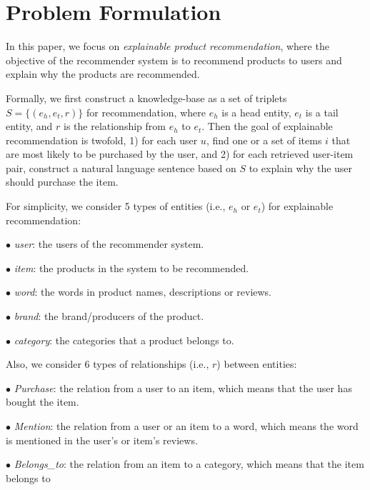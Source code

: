\documentclass[algorithms,article,accept,moreauthors,pdftex,10pt,a4paper]{Definitions/mdpi}
\begin{document}
\section{Problem Formulation}\label{sec:formalization}

In this paper, we focus on \textit{explainable product recommendation}, where the objective of the recommender system is to recommend products to users and explain why the products are recommended.


Formally, we first construct a knowledge-base as a set of triplets $S = \{(e_h, e_t, r)\}$ for recommendation, where $e_h$ is a head entity, $e_t$ is a tail entity, and $r$ is the relationship from $e_h$ to $e_t$.
Then the goal of explainable recommendation is twofold, 1) for each user $u$, find one or a set of items $i$ that are most likely to be purchased by the user, and 2) for each retrieved user-item pair, construct a natural language sentence based on $S$ to explain why the user should purchase the item.


\noindent
For simplicity, we consider 5 types of entities (i.e., $e_h$ or $e_t$) for explainable recommendation:

\vspace{6 pt}
$\bullet${ \textit{user}}: the users of the recommender system.

$\bullet$ \textit{item}: the products in the system to be recommended.

$\bullet$ \textit{word}: the words in product names, descriptions or reviews.

$\bullet$ \textit{brand}: the brand/producers of the product.

$\bullet$ \textit{category}: the categories that a product belongs to. 
\vspace{6 pt}




\noindent
\vspace{6 pt} Also, we consider 6 types of relationships (i.e., $r$) between entities:

$\bullet$ \textit{Purchase}: the relation from a user to an item, which means that the user has bought the item.

$\bullet$ \textit{Mention}: the relation from a user or an item to a word, which means the word is mentioned in the user's or item's reviews.

$\bullet$ \textit{Belongs\_to}: the relation from an item to a category, which means that the item belongs to 
\end{document}
